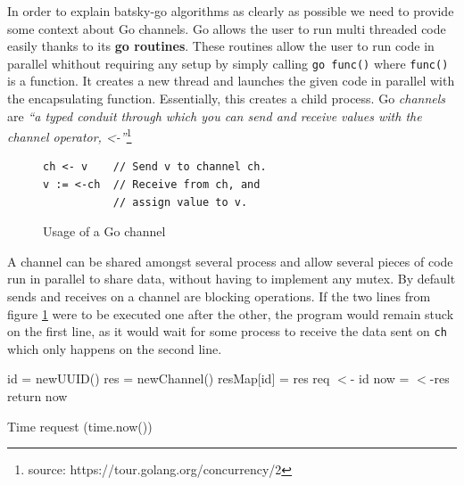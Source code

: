 In order to explain batsky-go algorithms as clearly as possible we need to
provide some context about Go channels. Go allows the user to run multi
threaded code easily thanks to its \textbf{go routines}. These routines allow
the user to run code in parallel whithout requiring any setup by simply calling
\texttt{go func()} where \texttt{func()} is a function.  It creates a new
thread and launches the given code in parallel with the encapsulating function.
Essentially, this creates a child process.  Go \textit{channels} are
\textit{``a typed conduit through which you can send and receive values with
the channel operator, <-''}\footnote{source:
https://tour.golang.org/concurrency/2}

\begin{figure}[]
	\begin{verbatim}
ch <- v    // Send v to channel ch.
v := <-ch  // Receive from ch, and
           // assign value to v.
   \end{verbatim}
   \caption{Usage of a Go channel}
   \label{fig:go-channel}
\end{figure}

A channel can be shared amongst several process and allow several pieces of
code run in parallel to share data, without having to implement any mutex. By
default sends and receives on a channel are blocking operations. If the two
lines from figure \ref{fig:go-channel} were to be executed one after the other,
the program would remain stuck on the first line, as it would wait for some
process to receive the data sent on \texttt{ch} which only happens on the
second line.\\


\begin{algorithm}[]
\DontPrintSemicolon
{}

id = newUUID()\;
res = newChannel()\;
resMap[id] = res 
req $<$- id 
now = $<$-res 
return now\;
\caption{Time request (time.now())}
\label{alg:now}
\end{algorithm}

